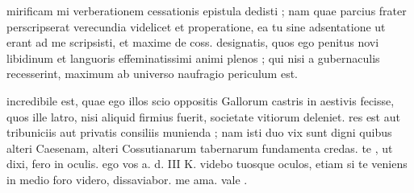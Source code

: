 


 mirificam mi verberationem cessationis epistula dedisti ; nam quae parcius frater perscripserat verecundia videlicet et properatione, ea tu sine adsentatione ut erant ad me scripsisti, et maxime de coss. designatis, quos ego penitus novi libidinum et languoris effeminatissimi animi plenos ; qui nisi a gubernaculis recesserint, maximum ab universo naufragio periculum est.

 incredibile est, quae ego illos scio oppositis Gallorum castris in aestivis fecisse, quos ille latro, nisi aliquid firmius fuerit, societate vitiorum deleniet. res est aut tribuniciis aut privatis consiliis munienda ; nam isti duo vix sunt digni quibus alteri Caesenam, alteri Cossutianarum tabernarum fundamenta credas. te , ut dixi, fero in oculis. ego vos a. d. III K. videbo tuosque oculos, etiam si te veniens in medio foro videro, dissaviabor. me ama. vale .
